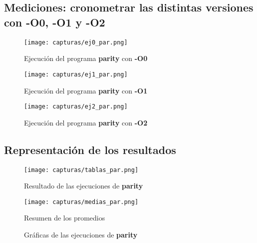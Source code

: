 \newpage

\subsection{Mediciones:	cronometrar las	distintas versiones con	-O0, -O1 y -O2}



\begin{figure}[H] %
	\centering
	\texttt{[image: capturas/ej0\_par.png]} 
	\caption{Ejecución del programa \textbf{parity} con \textbf{-O0}} 
	\label{fig:par1}
\end{figure}

\begin{figure}[H] %
	\centering
	\texttt{[image: capturas/ej1\_par.png]} 
	\caption{Ejecución del programa \textbf{parity} con \textbf{-O1}} 
	\label{fig:par3}
\end{figure}

\begin{figure}[H] %
	\centering
	\texttt{[image: capturas/ej2\_par.png]} 
	\caption{Ejecución del programa \textbf{parity} con \textbf{-O2}} 
	\label{fig:par4}
\end{figure}

\newpage

\subsection{Representación de los resultados}
\begin{figure}[H] %
	\centering
	\texttt{[image: capturas/tablas\_par.png]} 
	\caption{Resultado de las ejecuciones de \textbf{parity}} 
	\label{fig:par5}
\end{figure}

\begin{figure}[H] %
	\centering
	\texttt{[image: capturas/medias\_par.png]} 
	\caption{Resumen de los promedios} 
	\label{fig:par6}
\end{figure}

\begin{figure}[htbp]
	\centering
	\caption{Gráficas de las ejecuciones de \textbf{parity}} \label{fig:par7}
\end{figure}

\newpage



